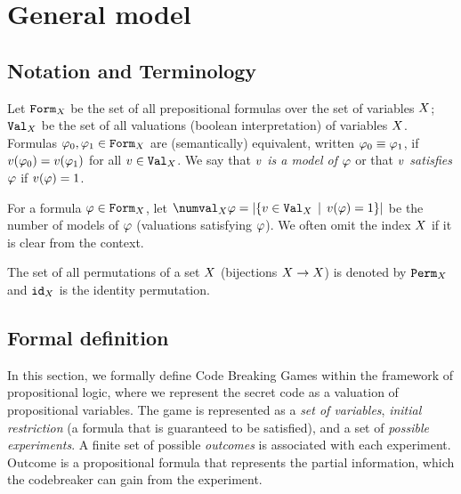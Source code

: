 \chapter{General model}

\section{Notation and Terminology}
Let $\mathtt{Form}_X$ be the set of all prepositional formulas over
  the set of variables $X$;
  $\mathtt{Val}_X$ be the set of all valuations (boolean interpretation)
  of variables $X$.
Formulas $\varphi_0, \varphi_1 \in \mathtt{Form}_X$ are (semantically) equivalent,
  written $\varphi_0 \equiv \varphi_1$, if
  $v(\varphi_0) = v(\varphi_1)$ for all $v\in\mathtt{Val}_X$.
We say that \emph{$v$ is a model of $\varphi$}
  or that \emph{$v$ satisfies $\varphi$}
  if $v(\varphi) = 1$.


For a formula $\varphi\in\mathtt{Form}_X$, let
  $\numval_\Var{\form} = |\{ \val\in\Val_\Var \| \val(\form) = 1 \}|$
  be the number of models of $\varphi$ (valuations satisfying $\varphi$).
We often omit the index $X$ if it is clear from the context.


The set of all permutations of a set $X$ (bijections $X->X$)
  is denoted by $\mathtt{Perm}_X$ and
  $\mathtt{id}_X$ is the identity permutation.

\section{Formal definition}


In this section, we formally define Code Breaking Games
  within the framework of propositional logic,
  where we represent the secret code as a valuation
  of propositional variables.
The game is represented as a \emph{set of variables},
  \emph{initial restriction} (a formula that is guaranteed to be satisfied),
  and a set of \emph{possible experiments}.
A finite set of possible \emph{outcomes} is associated with each experiment.
Outcome is a propositional formula that represents the partial information,
  which the codebreaker can gain from the experiment.

